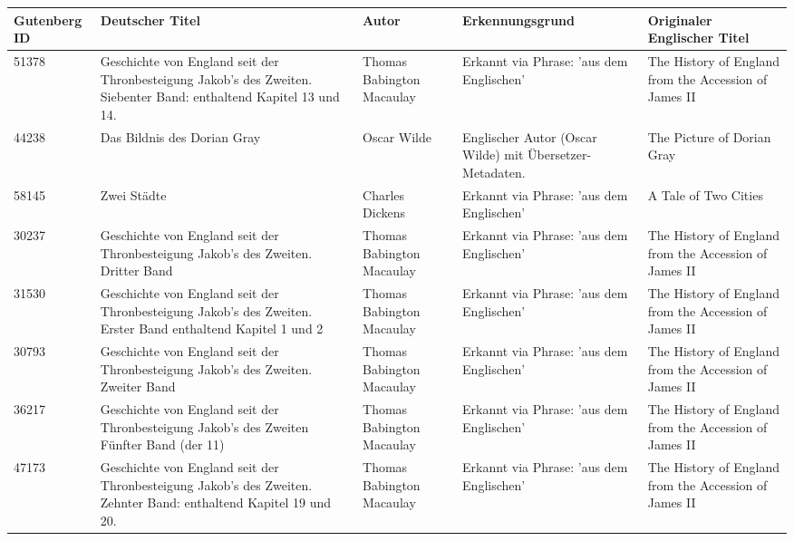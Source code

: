 \documentclass[11pt]{article}
\begin{document}
\begin{landscape}
  \begingroup
  \footnotesize                      %
  \setlength{\tabcolsep}{4pt}        %

  \begin{longtable}{ p{2cm} p{6cm} p{3.8cm} p{5.2cm} p{5.5cm} }
    
    \toprule
    \textbf{Gutenberg ID} & \textbf{Deutscher Titel} & \textbf{Autor} & \textbf{Erkennungsgrund} & \textbf{Originaler Englischer Titel} \\
    \midrule
    \endhead

    \bottomrule
    \endfoot

    51378 & Geschichte von England seit der Thronbesteigung Jakob's des Zweiten. Siebenter Band: enthaltend Kapitel 13 und 14. & Thomas Babington Macaulay & Erkannt via Phrase: 'aus dem Englischen' & The History of England from the Accession of James II \\
    44238 & Das Bildnis des Dorian Gray & Oscar Wilde & Englischer Autor (Oscar Wilde) mit Übersetzer-Metadaten. & The Picture of Dorian Gray \\
    58145 & Zwei Städte & Charles Dickens & Erkannt via Phrase: 'aus dem Englischen' & A Tale of Two Cities \\
    30237 & Geschichte von England seit der Thronbesteigung Jakob's des Zweiten. Dritter Band & Thomas Babington Macaulay & Erkannt via Phrase: 'aus dem Englischen' & The History of England from the Accession of James II \\
    31530 & Geschichte von England seit der Thronbesteigung Jakob's des Zweiten. Erster Band enthaltend Kapitel 1 und 2 & Thomas Babington Macaulay & Erkannt via Phrase: 'aus dem Englischen' & The History of England from the Accession of James II \\
    30793 & Geschichte von England seit der Thronbesteigung Jakob's des Zweiten. Zweiter Band & Thomas Babington Macaulay & Erkannt via Phrase: 'aus dem Englischen' & The History of England from the Accession of James II \\
    36217 & Geschichte von England seit der Thronbesteigung Jakob's des Zweiten Fünfter Band (der 11) & Thomas Babington Macaulay & Erkannt via Phrase: 'aus dem Englischen' & The History of England from the Accession of James II \\
    47173 & Geschichte von England seit der Thronbesteigung Jakob's des Zweiten. Zehnter Band: enthaltend Kapitel 19 und 20. & Thomas Babington Macaulay & Erkannt via Phrase: 'aus dem Englischen' & The History of England from the Accession of James II \\

\end{longtable}
\end{landscape}
\end{document}
